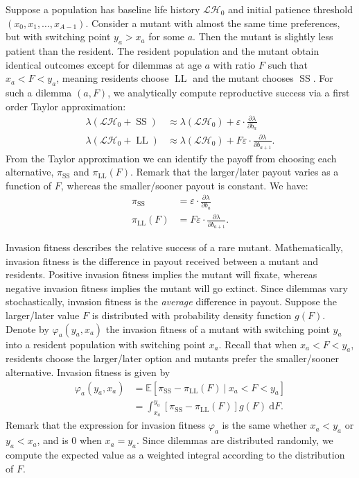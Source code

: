 \documentclass[titlepage, hidelinks, 12pt]{article}
\theoremstyle{plain}
\theoremstyle{remark}
\theoremstyle{definition}
\newcommand{\varSS}{\frac{\partial \lambda}{ \partial b_{a}}}
\newcommand{\varLL}{\frac{\partial \lambda}{ \partial b_{a+1}}}
\newcommand{\LH}{\mathcal{LH}}
\DeclareMathOperator{\smallersooner}{SS}
\DeclareMathOperator{\largerlater}{LL}
\renewcommand\d[1]{\:\textrm{d}#1}
\begin{document}
Suppose a population has baseline life history $\LH_0$ and 
initial patience threshold $(x_0, x_1, \ldots, x_{A-1})$. Consider a mutant with almost the same time preferences, but
with switching point $y_a > x_a$ for some $a$. Then the mutant is slightly less patient than the resident.
The resident population and the mutant obtain identical outcomes except for dilemmas at age $a$ with ratio $F$ such that $x_a < F < y_a$, meaning
residents choose $\largerlater$ and the mutant chooses $\smallersooner$. 
For such a dilemma $(a, F)$, we analytically compute reproductive success via a first order Taylor
approximation: 
\begin{align}
    \lambda(\LH_0 + \smallersooner) &\approx \lambda(\LH_0) + \varepsilon \cdot \varSS \\
    \lambda(\LH_0 + \largerlater) &\approx \lambda(\LH_0) + F\varepsilon \cdot \varLL.
\end{align}
From the Taylor approximation we can identify the payoff from choosing each alternative, 
$\pi_{\smallersooner}$ and $\pi_{\largerlater}(F)$. Remark that the larger/later payout
varies as a function of $F$, whereas the smaller/sooner payout is constant. We have: 
\begin{align}
    \pi_{\smallersooner} &= \varepsilon\cdot \varSS \label{eqn:varss} \\ 
    \pi_{\largerlater}(F) &= F\varepsilon\cdot \varLL. \label{eqn:varll}
\end{align}

Invasion fitness describes the relative success of a rare mutant.  Mathematically, invasion fitness is the difference in payout received between a mutant 
and residents. 
Positive invasion fitness implies the mutant will fixate, whereas negative
invasion fitness implies the mutant will go extinct.
Since dilemmas
vary stochastically, invasion fitness is the \textit{average} difference in payout. Suppose the larger/later value $F$ is distributed with probability
density function $g(F)$. 
Denote by $\varphi_a(y_a, x_a)$ the invasion fitness of a mutant with switching point
$y_a$ into a resident population with switching point $x_a$.  
Recall that when $x_a < F < y_a$, residents choose the larger/later option and mutants prefer the smaller/sooner alternative. 
Invasion fitness is given by
\begin{align}
    \varphi_a(y_a, x_a) &= \mathbb{E}\left[ \pi_{\smallersooner} - \pi_{\largerlater}(F) \ | \ x_a < F < y_a\right] \\
    &= \int_{x_a}^{y_a} \left[ \pi_{\smallersooner} - \pi_{\largerlater}(F) \right]g(F) \d F. 
\end{align}
Remark that the expression for invasion fitness
$\varphi_a$ is the same whether $x_a < y_a$ or $y_a < x_a$, and is $0$ when $x_a = y_a$. 
Since dilemmas are distributed randomly, we compute the expected value as a weighted integral according to the distribution of $F$.
\end{document}
